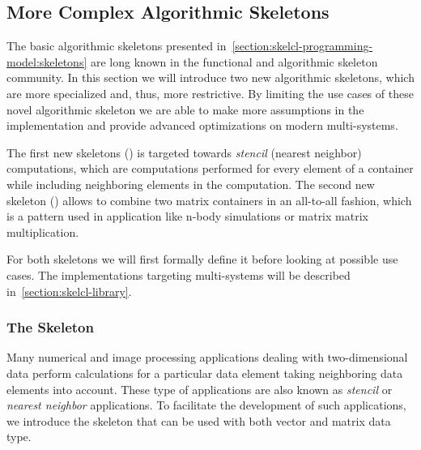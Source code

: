 \subsection{More Complex Algorithmic Skeletons}
\label{section:skelcl-programming-model:specialSkeletons}

The basic algorithmic skeletons presented in~\autoref{section:skelcl-programming-model:skeletons} are long known in the functional and algorithmic skeleton community.
In this section we will introduce two new algorithmic skeletons, which are more specialized and, thus, more restrictive.
By limiting the use cases of these novel algorithmic skeleton we are able to make more assumptions in the implementation and provide advanced optimizations on modern multi-\GPU systems.

The first new skeletons (\stencil) is targeted towards \emph{stencil} (\aka nearest neighbor) computations, which are computations performed for every element of a container while including neighboring elements in the computation.
The second new skeleton (\allpairs) allows to combine two matrix containers in an all-to-all fashion, which is a pattern used in application like n-body simulations or matrix matrix multiplication.

For both skeletons we will first formally define it before looking at possible use cases.
The implementations targeting multi-\GPU systems will be described in~\autoref{section:skelcl-library}.


\subsubsection{The \stencil Skeleton}

Many numerical and image processing applications dealing with two-dimensional data perform calculations for a particular data element taking neighboring data elements into account.
These type of applications are also known as \emph{stencil} or \emph{nearest neighbor} applications.
To facilitate the development of such applications, we introduce the \stencil skeleton that can be used with both vector and matrix data type.

